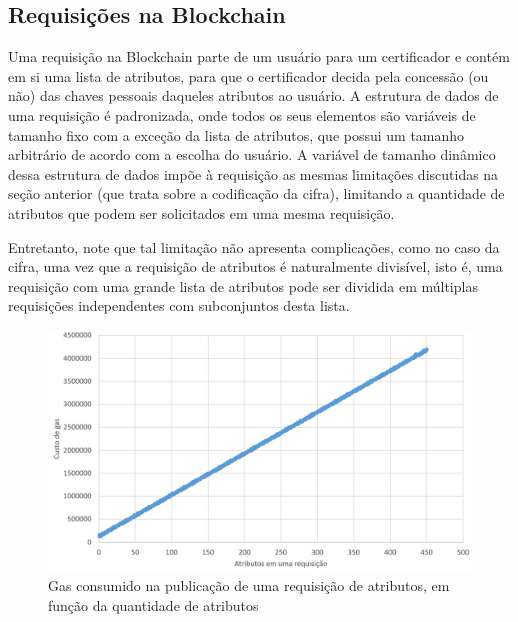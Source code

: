 \documentclass[a4paper,11pt]{article}
\begin{document}

\subsection{Requisições na Blockchain}
\label{sec:sub:experimento-requisicoes}

Uma requisição na Blockchain parte de um usuário para um certificador e contém em si uma lista de atributos, para que o certificador decida pela concessão (ou não) das chaves pessoais daqueles atributos ao usuário.
A estrutura de dados de uma requisição é padronizada, onde todos os seus elementos são variáveis de tamanho fixo com a exceção da lista de atributos, que possui um tamanho arbitrário de acordo com a escolha do usuário.
A variável de tamanho dinâmico dessa estrutura de dados impõe à requisição as mesmas limitações discutidas na seção anterior (que trata sobre a codificação da cifra), limitando a quantidade de atributos que podem ser solicitados em uma mesma requisição.%

Entretanto, note que tal limitação não apresenta complicações, como no caso da cifra, uma vez que a requisição de atributos é naturalmente divisível, isto é, uma requisição com uma grande lista de atributos pode ser dividida em múltiplas requisições independentes com subconjuntos desta lista.

\begin{figure}[!h]
    \centering
    \includegraphics[width=\textwidth]{images/resultados-crescimento-custo-requisicao.png}
    \caption{Gas consumido na publicação de uma requisição de atributos, em função da quantidade de atributos}
    \label{fig:custo-transacao}
\end{figure}
\end{document}
